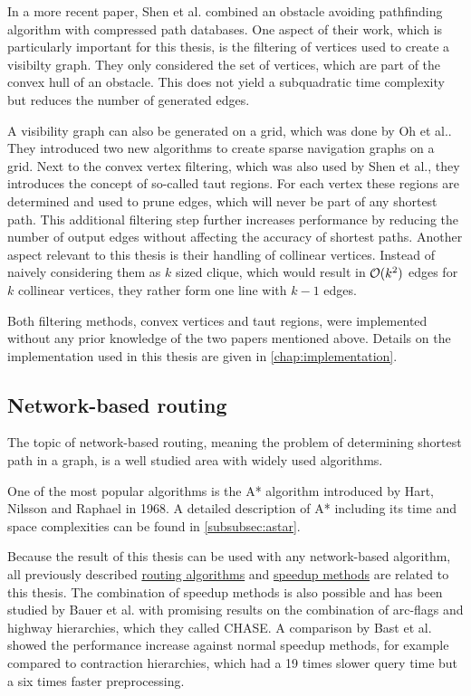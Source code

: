 		In a more recent paper, Shen et al. combined an obstacle avoiding pathfinding algorithm with compressed path databases\cite{shen-euclidean-routing-cpd}.
		One aspect of their work, which is particularly important for this thesis, is the filtering of vertices used to create a visibilty graph.
		They only considered the set of vertices, which are part of the convex hull of an obstacle.
		This does not yield a subquadratic time complexity but reduces the number of generated edges.
		
		A visibility graph can also be generated on a grid, which was done by Oh et al.\cite{oh-grid-vgraph}.
		They introduced two new algorithms to create sparse navigation graphs on a grid.
		Next to the convex vertex filtering, which was also used by Shen et al., they introduces the concept of so-called taut regions.
		For each vertex these regions are determined and used to prune edges, which will never be part of any shortest path.
		This additional filtering step further increases performance by reducing the number of output edges without affecting the accuracy of shortest paths.
		Another aspect relevant to this thesis is their handling of collinear vertices.
		Instead of naively considering them as $k$ sized clique, which would result in $\mathcal{O}(k^2)$ edges for $k$ collinear vertices, they rather form one line with $k-1$ edges.
		
		Both filtering methods, convex vertices and taut regions, were implemented without any prior knowledge of the two papers mentioned above.
		Details on the implementation used in this thesis are given in \cref{chap:implementation}.
		
	\subsection{Network-based routing}
	
		The topic of network-based routing, meaning the problem of determining shortest path in a graph, is a well studied area with widely used algorithms.
		
		One of the most popular algorithms is the A* algorithm introduced by Hart, Nilsson and Raphael in 1968\cite{astar}.
		A detailed description of A* including its time and space complexities can be found in \cref{subsubsec:astar}.

		Because the result of this thesis can be used with any network-based algorithm, all previously described \hyperref[subsec:routing-engines]{routing algorithms} and \hyperref[subsec:speedup-methods]{speedup methods} are related to this thesis.
		The combination of speedup methods is also possible and has been studied by Bauer et al.\cite{bauer-combining-speedup-methods} with promising results on the combination of arc-flags and highway hierarchies, which they called CHASE.
		A comparison by Bast et al. showed the performance increase against normal speedup methods\cite{bast-transportation-networks}, for example compared to contraction hierarchies, which had a 19 times slower query time but a six times faster preprocessing.

